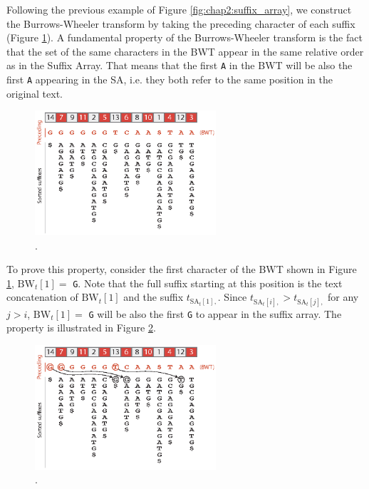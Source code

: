 Following the previous example of Figure \ref{fig:chap2:suffix_array},
we construct the Burrows-Wheeler transform by taking the preceding
character of each suffix (Figure \ref{fig:chap2:bwt_sa}). A
fundamental property of the Burrows-Wheeler transform is the fact that
the set of the same characters in the BWT appear in the same relative
order as in the Suffix Array. That means that the first \texttt{A} in
the BWT will be also the first \texttt{A} appearing in the SA,
i.e. they both refer to the same position in the original text.

\begin{figure}[h]
	\begin{minipage}[b]{\linewidth}
	  \centering
	  \includegraphics*[width=0.6\textwidth]{figures/chap2_bwt_sa}
	  \caption{.}
	  \label{fig:chap2:bwt_sa}
   \end{minipage}
\end{figure}

To prove this property, consider the first character of the BWT shown
in Figure \ref{fig:chap2:bwt_sa}, $\mbox{BW}_t[1] =$ \texttt{G}. Note
that the full suffix starting at this position is the text
concatenation of $\mbox{BW}_t[1]$ and the suffix
$t_{\mbox{SA}_t[1],}$. Since $t_{\mbox{SA}_t[i],} >
t_{\mbox{SA}_t[j],}$ for any $j>i$, $\mbox{BW}_t[1] =$ \texttt{G} will
be also the first \texttt{G} to appear in the suffix array. The
property is illustrated in Figure \ref{fig:chap2:bwt_order}.

\begin{figure}[h]
	\begin{minipage}[b]{\linewidth}
	  \centering
	  \includegraphics*[width=0.6\textwidth]{figures/chap2_bwt_order}
	  \caption{.}
	  \label{fig:chap2:bwt_order}
   \end{minipage}
\end{figure}

